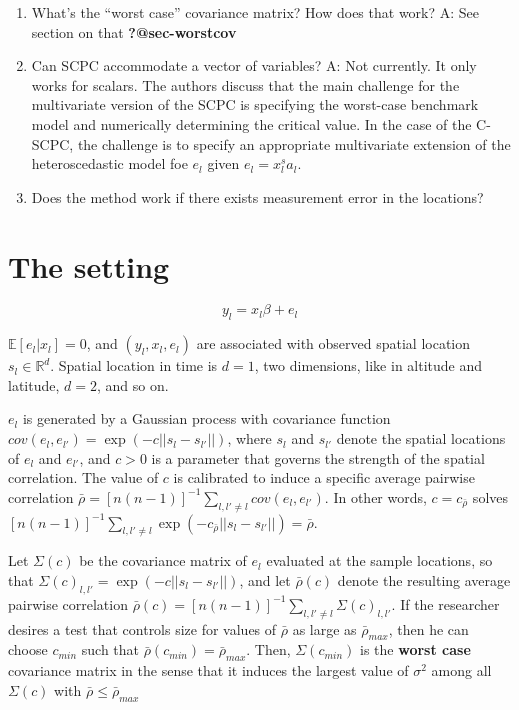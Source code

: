 \documentclass[
]{article}
\providecommand{\tightlist}{%
  \setlength{\itemsep}{0pt}\setlength{\parskip}{0pt}}\usepackage{longtable,booktabs,array}
\begin{document}
\begin{enumerate}
\def\labelenumi{\arabic{enumi}.}
\tightlist
\item
  What's the ``worst case'' covariance matrix? How does that work? A:
  See section on that \textbf{?@sec-worstcov}
\item
  Can SCPC accommodate a vector of variables? A: Not currently. It only
  works for scalars. The authors discuss that the main challenge for the
  multivariate version of the SCPC is specifying the worst-case
  benchmark model and numerically determining the critical value. In the
  case of the C-SCPC, the challenge is to specify an appropriate
  multivariate extension of the heteroscedastic model foe \(e_l\) given
  \(e_l=x^s_la_l\).
\item
  Does the method work if there exists measurement error in the
  locations?
\end{enumerate}

\hypertarget{the-setting}{%
\section{The setting}\label{the-setting}}

\[
y_l = x_l\beta + e_l
\]

\(\mathbb{E}[e_l|x_l]=0\), and \((y_l, x_l, e_l)\) are associated with
observed spatial location \(s_l \in \mathbb{R}^d\). Spatial location in
time is \(d=1\), two dimensions, like in altitude and latitude, \(d=2\),
and so on.

\(e_l\) is generated by a Gaussian process with covariance function
\(cov(e_l,e_{l'})=\exp(-c||s_l-s_{l'}||)\), where \(s_l\) and \(s_{l'}\)
denote the spatial locations of \(e_l\) and \(e_{l'}\), and \(c>0\) is a
parameter that governs the strength of the spatial correlation. The
value of \(c\) is calibrated to induce a specific average pairwise
correlation
\(\bar{\rho}=[n(n-1)]^{-1}\sum_{l,l'\not=l}cov(e_l,e_{l'})\). In other
words, \(c=c_{\bar{\rho}}\) solves
\([n(n-1)]^{-1}\sum_{l,l'\not=l}\exp(-c_{\bar{\rho}}||s_l-s_{l'}||)=\bar{\rho}\).

Let \(\Sigma(c)\) be the covariance matrix of \(e_l\) evaluated at the
sample locations, so that \(\Sigma(c)_{l,l'}=\exp(-c||s_l-s_{l'} ||)\),
and let \(\bar{\rho}(c)\) denote the resulting average pairwise
correlation
\(\bar{\rho}(c)=[n(n-1)]^{-1}\sum_{l,l'\not=l}\Sigma(c)_{l,l'}\). If the
researcher desires a test that controls size for values of
\(\bar{\rho}\) as large as \(\bar{\rho}_{max}\), then he can choose
\(c_{min}\) such that \(\bar{\rho}(c_{min})=\bar{\rho}_{max}\). Then,
\(\Sigma(c_{min})\) is the \textbf{worst case} covariance matrix in the
sense that it induces the largest value of \(\sigma^2\) among all
\(\Sigma(c)\) with \(\bar{\rho}\le \bar{\rho}_{max}\)
\end{document}
